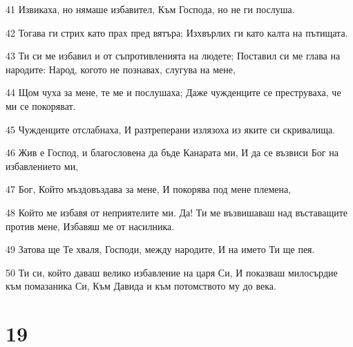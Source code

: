 \par 41 Извикаха, но нямаше избавител, Към Господа, но не ги послуша.
\par 42 Тогава ги стрих като прах пред вятъра; Изхвърлих ги като калта на пътищата.
\par 43 Ти си ме избавил и от съпротивленията на людете; Поставил си ме глава на народите: Народ, когото не познавах, слугува на мене,
\par 44 Щом чуха за мене, те ме и послушаха; Даже чужденците се преструваха, че ми се покоряват.
\par 45 Чужденците отслабнаха, И разтреперани излязоха из яките си скривалища.
\par 46 Жив е Господ, и благословена да бъде Канарата ми, И да се възвиси Бог на избавлението ми,
\par 47 Бог, Който мъздовъздава за мене, И покорява под мене племена,
\par 48 Който ме избавя от неприятелите ми. Да! Ти ме възвишаваш над въставащите против мене, Избавяш ме от насилника.
\par 49 Затова ще Те хваля, Господи, между народите, И на името Ти ще пея.
\par 50 Ти си, който даваш велико избавление на царя Си, И показваш милосърдие към помазаника Си, Към Давида и към потомството му до века.

\chapter{19}

